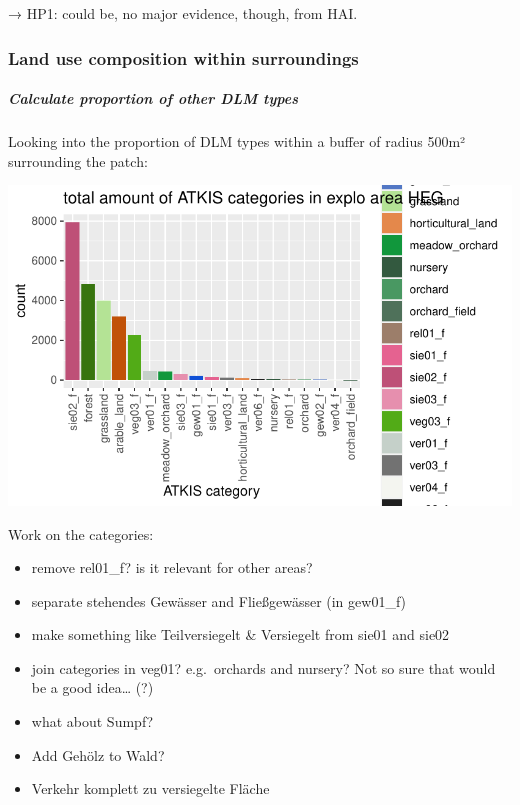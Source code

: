 \documentclass[
  letterpaper,
  DIV=11,
  numbers=noendperiod]{scrartcl}
\let\oldsubparagraph\subparagraph
\renewcommand{\subparagraph}[1]{\oldsubparagraph{#1}\mbox{}}
\begin{document}
→ HP1: could be, no major evidence, though, from HAI.

\hypertarget{land-use-composition-within-surroundings}{%
\subsubsection{\texorpdfstring{Land use \textbf{composition within
surroundings}}{Land use composition within surroundings}}\label{land-use-composition-within-surroundings}}

\hypertarget{calculate-proportion-of-other-dlm-types}{%
\subparagraph{Calculate proportion of other DLM
types}\label{calculate-proportion-of-other-dlm-types}}

Looking into the proportion of DLM types within a buffer of radius 500m²
surrounding the patch:

\includegraphics{Landscape_Indices_files/figure-pdf/unnamed-chunk-11-1.pdf}

Work on the categories:

\begin{itemize}
\item
  remove rel01\_f? is it relevant for other areas?
\item
  separate stehendes Gewässer and Fließgewässer (in gew01\_f)
\item
  make something like Teilversiegelt \& Versiegelt from sie01 and sie02
\item
  join categories in veg01? e.g.~orchards and nursery? Not so sure that
  would be a good idea\ldots{} (?)
\item
  what about Sumpf?
\item
  Add Gehölz to Wald?
\item
  Verkehr komplett zu versiegelte Fläche
\end{itemize}
\end{document}
